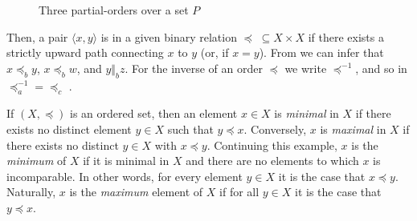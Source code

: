\begin{figure}[H]
  \centering
  \begin{subfigure}{0.3\textwidth}
    \centering
    \label{subfigure:partial-order-a}
  \end{subfigure}%
  \begin{subfigure}{0.3\textwidth}
    \centering
    \label{subfigure:partial-order-b}
  \end{subfigure}%
  \begin{subfigure}{0.3\textwidth}
    \centering
    \label{subfigure:partial-order-c}
  \end{subfigure}%
  \caption{Three partial-orders over a set $P$}
  \label{figure:hasse-diagram}
\end{figure}

Then, a pair $\langle x,y \rangle$ is in a given binary relation $\preceq \; \subseteq X \times X$ if there exists a strictly upward path connecting $x$ to $y$ (or, if $x = y$). From  we can infer that $x \preceq_b y$, $x \preceq_b w$, and $y \Vert_b z$. For the inverse of an order $\preceq$ we write $\preceq^{-1}$, and so in  $\preceq_a^{-1} = \preceq_c$ \cite{ganter1999formal}.

If $(X,\preceq)$ is an ordered set, then an element $x \in X$ is \textit{minimal} in $X$ if there exists no distinct element $y \in X$ such that $y \preceq x$. Conversely, $x$ is \textit{maximal} in $X$ if there exists no distinct $y \in X$ with $x \preceq y$. Continuing this example, $x$ is the \textit{minimum} of $X$ if it is minimal in $X$ and there are no elements to which $x$ is incomparable. In other words, for every element $y \in X$ it is the case that $x \preceq y$. Naturally, $x$ is the \textit{maximum} element of $X$ if for all $y \in X$ it is the case that $y \preceq x$.

